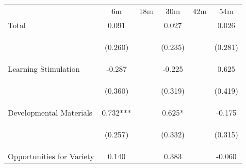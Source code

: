 \begin{tabular}{lccccc}
\hline \noalign{\smallskip} & 6m & 18m & 30m & 42m & 54m\\
\noalign{\smallskip}\hline \noalign{\smallskip}Total & 0.091 &  & 0.027 &  & 0.026\\
 & \begin{footnotesize}(0.260)\end{footnotesize} & \begin{footnotesize}\end{footnotesize} & \begin{footnotesize}(0.235)\end{footnotesize} & \begin{footnotesize}\end{footnotesize} & \begin{footnotesize}(0.281)\end{footnotesize}\\
\noalign{\smallskip}Learning Stimulation & -0.287 &  & -0.225 &  & 0.625\\
 & \begin{footnotesize}(0.360)\end{footnotesize} & \begin{footnotesize}\end{footnotesize} & \begin{footnotesize}(0.319)\end{footnotesize} & \begin{footnotesize}\end{footnotesize} & \begin{footnotesize}(0.419)\end{footnotesize}\\
\noalign{\smallskip}Developmental Materials & 0.732*** &  & 0.625* &  & -0.175\\
 & \begin{footnotesize}(0.257)\end{footnotesize} & \begin{footnotesize}\end{footnotesize} & \begin{footnotesize}(0.332)\end{footnotesize} & \begin{footnotesize}\end{footnotesize} & \begin{footnotesize}(0.315)\end{footnotesize}\\
\noalign{\smallskip}Opportunities for Variety & 0.140 &  & 0.383 &  & -0.060\\

\end{tabular}
